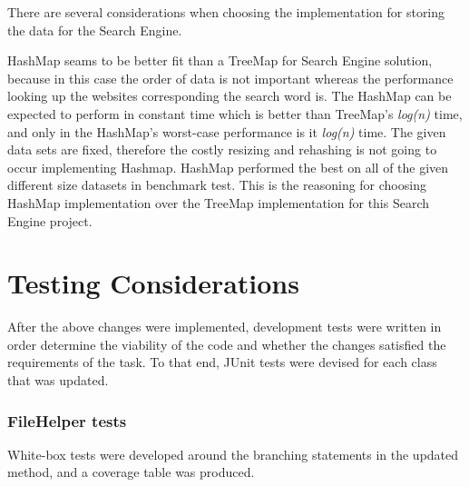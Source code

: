There are several considerations when choosing the implementation for storing the data for the Search Engine.

HashMap seams to be better fit than a TreeMap for Search Engine solution, because in this case the order of data is not important whereas the performance looking up the websites corresponding the search word is. The HashMap can be expected to perform in constant time which is better than TreeMap's \textit{log(n)} time, and only in the HashMap's worst-case performance is it \textit{log(n)} time. The given data sets are fixed, therefore the costly resizing and rehashing is not going to occur implementing Hashmap. HashMap performed the best on all of the given different size datasets in benchmark test. This is the reasoning for choosing HashMap implementation over the TreeMap implementation for this Search Engine project.




\section{Testing Considerations}
After the above changes were implemented, development tests were written in order determine the viability of the code and whether the changes satisfied the requirements of the task. To that end, JUnit tests were devised for each class that was updated.

\subsubsection{FileHelper tests}

White-box tests were developed around the branching statements in the updated method, and a coverage table was produced.

